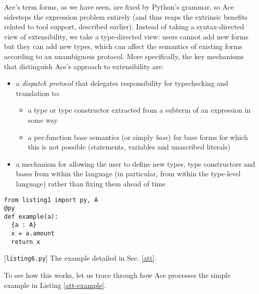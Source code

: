 \documentclass[10pt,preprint]{sigplanconf}
\begin{document}
{Ace's term forms, as we have seen, are fixed by Python's grammar, so Ace sidesteps the expression problem entirely (and thus reaps the extrinsic benefits related to tool support, described earlier). Instead of taking a syntax-directed view of extensibility, we take a type-directed view: users cannot add new forms but they can add new types, which can affect the semantics of existing forms according to an unambiguous protocol. %
More specifically, the key mechanisms that distinguish Ace's approach to extensibility are: \begin{itemize}
\item a \emph{dispatch protocol} that delegates responsibility for typechecking and translation to:
  \begin{itemize}
  \item a type or type constructor extracted from a subterm of an expression in some way
  \item a per-function base semantics (or simply \emph{base}) for base forms for which this is not possible  (statements, variables and unascribed literals)
  \end{itemize}
\item a mechanism for allowing the user to define new types, type constructors and bases from within the language (in particular, from within the type-level language) rather than fixing them ahead of time
\end{itemize}
\begin{codelisting}
\begin{lstlisting}
from listing1 import py, A
@py
def example(a):
  {a : A}
  x = a.amount
  return x
\end{lstlisting}
\caption{[\texttt{listing6.py}] The example detailed in Sec. \ref{att}.}
\label{att-example}
\end{codelisting}

To see how this works, let us trace through how Ace processes the simple example in Listing \ref{att-example}. 

}
\end{document}
